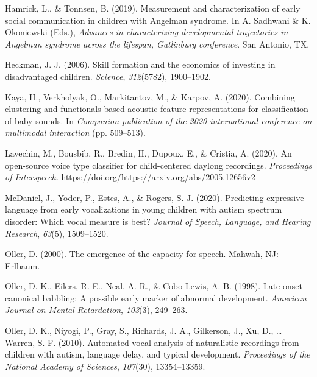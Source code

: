 \documentclass[english,,man]{apa6}
\begin{document}
\leavevmode\hypertarget{ref-hamrick2019measurement}{}%
Hamrick, L., \& Tonnsen, B. (2019). Measurement and characterization of early social communication in children with Angelman syndrome. In A. Sadhwani \& K. Okoniewski (Eds.), \emph{Advances in characterizing developmental trajectories in Angelman syndrome across the lifespan, Gatlinburg conference}. San Antonio, TX.

\leavevmode\hypertarget{ref-heckman2006skill}{}%
Heckman, J. J. (2006). Skill formation and the economics of investing in disadvantaged children. \emph{Science}, \emph{312}(5782), 1900--1902.

\leavevmode\hypertarget{ref-kaya2020combining}{}%
Kaya, H., Verkholyak, O., Markitantov, M., \& Karpov, A. (2020). Combining clustering and functionals based acoustic feature representations for classification of baby sounds. In \emph{Companion publication of the 2020 international conference on multimodal interaction} (pp. 509--513).

\leavevmode\hypertarget{ref-lavechin2020open}{}%
Lavechin, M., Bousbib, R., Bredin, H., Dupoux, E., \& Cristia, A. (2020). An open-source voice type classifier for child-centered daylong recordings. \emph{Proceedings of Interspeech}. \url{https://doi.org/https://arxiv.org/abs/2005.12656v2}

\leavevmode\hypertarget{ref-mcdaniel2020predicting}{}%
McDaniel, J., Yoder, P., Estes, A., \& Rogers, S. J. (2020). Predicting expressive language from early vocalizations in young children with autism spectrum disorder: Which vocal measure is best? \emph{Journal of Speech, Language, and Hearing Research}, \emph{63}(5), 1509--1520.

\leavevmode\hypertarget{ref-oller2000emergence}{}%
Oller, D. (2000). The emergence of the capacity for speech. Mahwah, NJ: Erlbaum.

\leavevmode\hypertarget{ref-oller1998late}{}%
Oller, D. K., Eilers, R. E., Neal, A. R., \& Cobo-Lewis, A. B. (1998). Late onset canonical babbling: A possible early marker of abnormal development. \emph{American Journal on Mental Retardation}, \emph{103}(3), 249--263.

\leavevmode\hypertarget{ref-oller2010automated}{}%
Oller, D. K., Niyogi, P., Gray, S., Richards, J. A., Gilkerson, J., Xu, D., \ldots{} Warren, S. F. (2010). Automated vocal analysis of naturalistic recordings from children with autism, language delay, and typical development. \emph{Proceedings of the National Academy of Sciences}, \emph{107}(30), 13354--13359.
\end{document}
